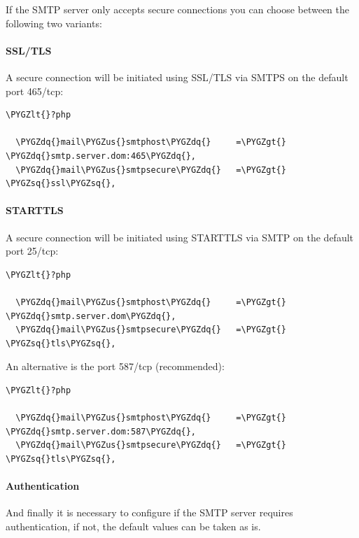 \documentclass[letterpaper,10pt,english]{sphinxmanual}
\def\PYGZus{\char`\_}
\def\PYGZlt{\char`\<}
\def\PYGZgt{\char`\>}
\def\PYGZsq{\char`\'}
\def\PYGZdq{\char`\"}
\begin{document}
If the SMTP server only accepts secure connections you can choose between
the following two variants:


\paragraph{SSL/TLS}
\label{configuration_server/email_configuration:ssl-tls}
A secure connection will be initiated using SSL/TLS via SMTPS on the default port 465/tcp:

\begin{Verbatim}[commandchars=\\\{\}]
\PYGZlt{}?php

  \PYGZdq{}mail\PYGZus{}smtphost\PYGZdq{}     =\PYGZgt{} \PYGZdq{}smtp.server.dom:465\PYGZdq{},
  \PYGZdq{}mail\PYGZus{}smtpsecure\PYGZdq{}   =\PYGZgt{} \PYGZsq{}ssl\PYGZsq{},
\end{Verbatim}


\paragraph{STARTTLS}
\label{configuration_server/email_configuration:starttls}
A secure connection will be initiated using STARTTLS via SMTP on the default port 25/tcp:

\begin{Verbatim}[commandchars=\\\{\}]
\PYGZlt{}?php

  \PYGZdq{}mail\PYGZus{}smtphost\PYGZdq{}     =\PYGZgt{} \PYGZdq{}smtp.server.dom\PYGZdq{},
  \PYGZdq{}mail\PYGZus{}smtpsecure\PYGZdq{}   =\PYGZgt{} \PYGZsq{}tls\PYGZsq{},
\end{Verbatim}

An alternative is the port 587/tcp (recommended):

\begin{Verbatim}[commandchars=\\\{\}]
\PYGZlt{}?php

  \PYGZdq{}mail\PYGZus{}smtphost\PYGZdq{}     =\PYGZgt{} \PYGZdq{}smtp.server.dom:587\PYGZdq{},
  \PYGZdq{}mail\PYGZus{}smtpsecure\PYGZdq{}   =\PYGZgt{} \PYGZsq{}tls\PYGZsq{},
\end{Verbatim}


\paragraph{Authentication}
\label{configuration_server/email_configuration:authentication}
And finally it is necessary to configure if the SMTP server requires
authentication, if not, the default values can be taken as is.
\end{document}
